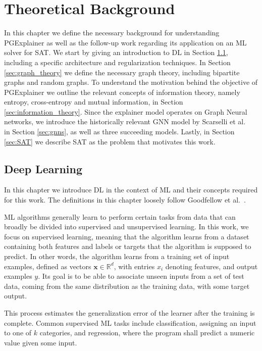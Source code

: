 \chapter{Theoretical Background}
\label{ch:Background}
In this chapter we define the necessary background for understanding PGExplainer as well as the follow-up work regarding its application on an ML solver for SAT. We start by giving an introduction to DL in Section \ref{sec:deep_learning}, including a specific architecture and regularization techniques. In Section \ref{sec:graph_theory} we define the necessary graph theory, including bipartite graphs and random graphs. To understand the motivation behind the objective of PGExplainer we outline the relevant concepts of information theory, namely entropy, cross-entropy and mutual information, in Section \ref{sec:information_theory}. Since the explainer model operates on Graph Neural networks, we introduce the historically relevant GNN model by Scarselli et al. ~\cite{4700287} in Section \ref{sec:gnns}, as well as three succeeding models. Lastly, in Section \ref{sec:SAT} we describe SAT as the problem that motivates this work.

\section{Deep Learning}
\label{sec:deep_learning}
In this chapter we introduce DL in the context of ML and their concepts required for this work. The definitions in this chapter loosely follow Goodfellow et al.~\cite{Goodfellow-et-al-2016}.

ML algorithms generally learn to perform certain tasks from data that can broadly be divided into supervised and unsupervised learning. In this work, we focus on supervised learning, meaning that the algorithm learns from a dataset containing both features and labels or targets that the algorithm is supposed to predict. In other words, the algorithm learns from a training set of input examples, defined as vectors $\mathbf{x} \in \mathbb{R}^d$, with entries $x_i$ denoting features, and output examples $y$. Its goal is to be able to associate unseen inputs from a set of test data, coming from the same distribution as the training data, with some target output.

This process estimates the generalization error of the learner after the training is complete. 
Common supervised ML tasks include classification, assigning an input to one of $k$ categories, and regression, where the program shall predict a numeric value given some input. \bigskip


